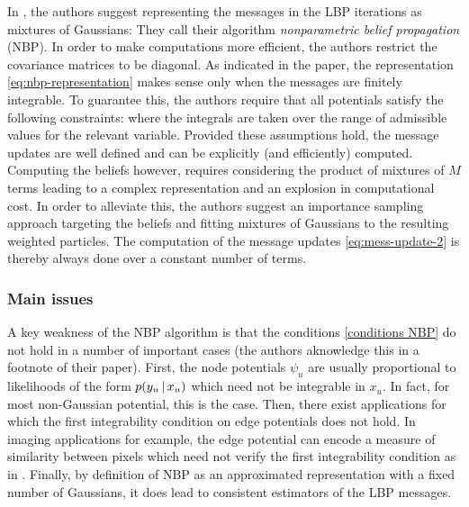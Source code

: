 In \citet{sudderth03}, the authors suggest representing the messages in the LBP iterations as mixtures of Gaussians:
They call their algorithm \emph{nonparametric belief propagation} (NBP). In order to make computations more efficient, the authors restrict the covariance matrices to be diagonal.
As indicated in the paper, the representation \eqref{eq:nbp-representation} makes sense only when the messages are finitely integrable. To guarantee this, the authors require that all potentials satisfy the following constraints:
where the integrals are taken over the range of admissible values for the relevant variable. Provided these assumptions hold, the message updates are well defined and can be explicitly (and efficiently) computed. Computing the beliefs however, requires considering the product of mixtures of $M$ terms leading to a complex representation and an explosion in computational cost. In order to alleviate this, the authors suggest an importance sampling approach targeting the beliefs and fitting mixtures of Gaussians to the resulting weighted particles. 
The computation of the message updates \eqref{eq:mess-update-2} is thereby always done over a constant number of terms.

\subsubsection*{Main issues}

A key weakness of the NBP algorithm is that the conditions \eqref{conditions NBP} do not hold in a number of important cases (the authors aknowledge this in a footnote of their paper). 
First, the node potentials $\psi_{u}$ are usually proportional to likelihoods of the form $p(y_{u}\,|\, x_{u})$ which need not be integrable in $x_{u}$. In fact, for most non-Gaussian potential, this is the case. Then, there exist applications for which the first integrability condition on edge potentials does not hold. In imaging applications for example, the edge potential can encode a measure of similarity between pixels which need not verify the first integrability condition as in \citet{nikolova00}. Finally, by definition of NBP as an approximated representation with a fixed number of Gaussians, it does lead to consistent estimators of the LBP messages.



